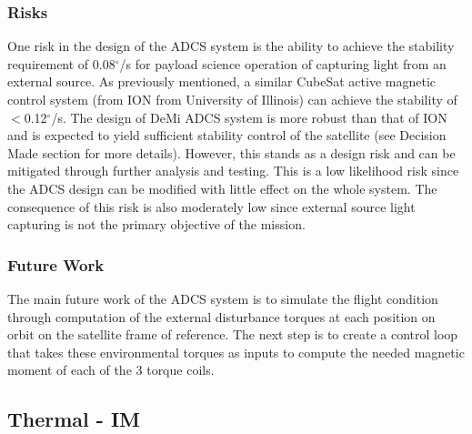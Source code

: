 \documentclass[12pt]{article}
\begin{document}
			\subsubsection{Risks}
			One risk in the design of the ADCS system is the ability to achieve the stability requirement of 0.08$^\circ$/s for payload science operation of capturing light from an external source. As previously mentioned, a similar CubeSat active magnetic control system (from ION from University of Illinois) can achieve the stability of $<$0.12$^\circ$/s. The design of DeMi ADCS system is more robust than that of ION and is expected to yield sufficient stability control of the satellite (see Decision Made section for more details). However, this stands as a design risk and can be mitigated through further analysis and testing. This is a low likelihood risk since the ADCS design can be modified with little effect on the whole system. The consequence of this risk is also moderately low since external source light capturing is not the primary objective of the mission. 
			\subsubsection{Future Work}
			The main future work of the ADCS system is to simulate the flight condition through computation of the external disturbance torques at each position on orbit on the satellite frame of reference. The next step is to create a control loop that takes these environmental torques as inputs to compute the needed magnetic moment of each of the 3 torque coils. 
			
			
\newpage
\FloatBarrier

\subsection{Thermal - IM}
		
\end{document}
